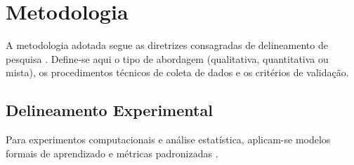 \section{Metodologia}
\label{sec:metodologia}

A metodologia adotada segue as diretrizes consagradas de delineamento de pesquisa \cite{marconi2017metodologia, creswell2022research}. Define-se aqui o tipo de abordagem (qualitativa, quantitativa ou mista), os procedimentos técnicos de coleta de dados e os critérios de validação.

\subsection{Delineamento Experimental}
Para experimentos computacionais e análise estatística, aplicam-se modelos formais de aprendizado e métricas padronizadas \cite{james2023statistical}.
